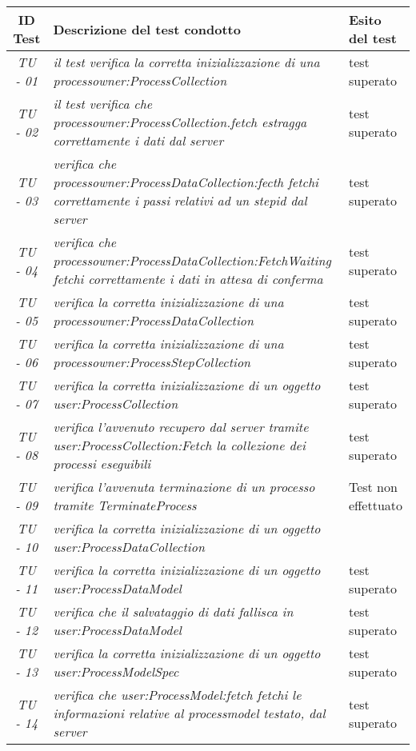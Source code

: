 
\begin{small}\centering
\begin{tabular}{|c|p{8.0cm}|p{2.0cm}|}
\hline
\textbf{ID Test} & \textbf{Descrizione del test condotto} & \textbf{Esito del test} \\
\hline
\textit{TU - 01} &
\textit{il test verifica la corretta inizializzazione di una processowner:ProcessCollection} & test superato \\
\hline
\textit{TU - 02} &
\textit{il test verifica che  processowner:ProcessCollection.fetch estragga correttamente i dati dal server } & test superato \\
\hline
\textit{TU - 03} & 
\textit{verifica che processowner:ProcessDataCollection:fecth fetchi correttamente i passi relativi ad un stepid dal server} & test superato  \\
\hline
\textit{TU - 04} &
\textit{verifica che processowner:ProcessDataCollection:FetchWaiting fetchi correttamente i dati in attesa di conferma} & test superato  \\
\hline
\textit{TU - 05} &
\textit{verifica la corretta inizializzazione di una processowner:ProcessDataCollection } & test superato \\
\hline
\textit{TU - 06} &
\textit{verifica la corretta inizializzazione di una processowner:ProcessStepCollection} & test superato  \\
\hline
\textit{TU - 07} &
\textit{verifica la corretta inizializzazione di un oggetto user:ProcessCollection} &  test superato\\
\hline
\textit{TU - 08} &
\textit{verifica l'avvenuto recupero dal server tramite user:ProcessCollection:Fetch la collezione dei processi eseguibili} & test superato \\
\hline
\textit{TU - 09} &
\textit{verifica l'avvenuta terminazione di un processo tramite TerminateProcess} & Test non effettuato \\
\hline
\textit{TU - 10} &
\textit{verifica la corretta inizializzazione di un oggetto user:ProcessDataCollection} &  \\
\hline
\textit{TU - 11} &
\textit{verifica la corretta inizializzazione di un oggetto user:ProcessDataModel} & test superato \\
\hline
\textit{TU - 12} &
\textit{verifica che il salvataggio di dati fallisca in user:ProcessDataModel} & test superato \\
\hline
\textit{TU - 13} &
\textit{verifica la corretta inizializzazione di un oggetto user:ProcessModelSpec} & test superato \\
\hline
\textit{TU - 14} &
\textit{verifica che user:ProcessModel:fetch fetchi le informazioni relative al processmodel testato, dal server} & test superato \\
\hline

\end{tabular}\\
\end{small}